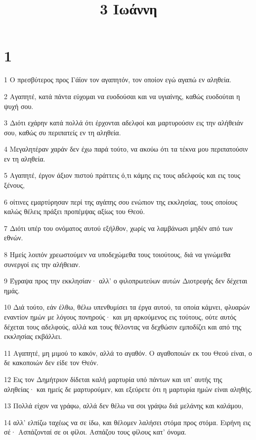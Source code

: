 

\title{3 Ιωάννη}


\chapter{1}

\par 1 Ο πρεσβύτερος προς Γάϊον τον αγαπητόν, τον οποίον εγώ αγαπώ εν αληθεία.
\par 2 Αγαπητέ, κατά πάντα εύχομαι να ευοδούσαι και να υγιαίνης, καθώς ευοδούται η ψυχή σου.
\par 3 Διότι εχάρην κατά πολλά ότι έρχονται αδελφοί και μαρτυρούσιν εις την αλήθειάν σου, καθώς συ περιπατείς εν τη αληθεία.
\par 4 Μεγαλητέραν χαράν δεν έχω παρά τούτο, να ακούω ότι τα τέκνα μου περιπατούσιν εν τη αληθεία.
\par 5 Αγαπητέ, έργον άξιον πιστού πράττεις ό,τι κάμης εις τους αδελφούς και εις τους ξένους,
\par 6 οίτινες εμαρτύρησαν περί της αγάπης σου ενώπιον της εκκλησίας, τους οποίους καλώς θέλεις πράξει προπέμψας αξίως του Θεού.
\par 7 Διότι υπέρ του ονόματος αυτού εξήλθον, χωρίς να λαμβάνωσι μηδέν από των εθνών.
\par 8 Ημείς λοιπόν χρεωστούμεν να υποδεχώμεθα τους τοιούτους, διά να γινώμεθα συνεργοί εις την αλήθειαν.
\par 9 Έγραψα προς την εκκλησίαν· αλλ' ο φιλοπρωτεύων αυτών Διοτρεφής δεν δέχεται ημάς.
\par 10 Διά τούτο, εάν έλθω, θέλω υπενθυμίσει τα έργα αυτού, τα οποία κάμνει, φλυαρών εναντίον ημών με λόγους πονηρούς· και μη αρκούμενος εις τούτους, ούτε αυτός δέχεται τους αδελφούς, αλλά και τους θέλοντας να δεχθώσιν εμποδίζει και από της εκκλησίας εκβάλλει.
\par 11 Αγαπητέ, μη μιμού το κακόν, αλλά το αγαθόν. Ο αγαθοποιών εκ του Θεού είναι, ο δε κακοποιών δεν είδε τον Θεόν.
\par 12 Εις τον Δημήτριον δίδεται καλή μαρτυρία υπό πάντων και υπ' αυτής της αληθείας· και ημείς δε μαρτυρούμεν, και εξεύρετε ότι η μαρτυρία ημών είναι αληθής.
\par 13 Πολλά είχον να γράφω, αλλά δεν θέλω να σοι γράψω διά μελάνης και καλάμου,
\par 14 αλλ' ελπίζω ταχέως να σε ίδω, και θέλομεν λαλήσει στόμα προς στόμα. Ειρήνη εις σέ· Ασπάζονταί σε οι φίλοι. Ασπάζου τους φίλους κατ' όνομα.


